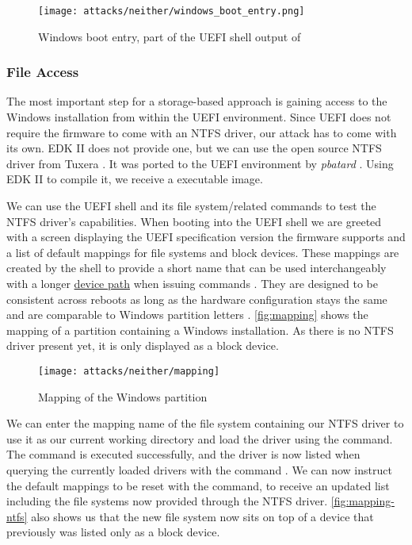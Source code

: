 \begin{figure}[htb]
    \centering
    \texttt{[image: attacks/neither/windows\_boot\_entry.png]}
    \caption{Windows boot entry, part of the \ac{UEFI} shell output of }
    \label{fig:windows-boot-entry}
\end{figure}

\subsubsection{File Access}

The most important step for a storage-based approach is gaining access to the Windows installation from within the \ac{UEFI} environment.
Since \ac{UEFI} does not require the firmware to come with an \ac{NTFS} driver, our attack has to come with its own.
\ac{EDK} II does not provide one, but we can use the open source \ac{NTFS} driver  from Tuxera \cite{ntfs-3g}.
It was ported to the \ac{UEFI} environment by \emph{pbatard} \cite{ntfs-3g-uefi}.
Using \ac{EDK} II to compile it, we receive a  executable image.

We can use the \ac{UEFI} shell and its file system\-/related commands to test the \ac{NTFS} driver's capabilities.
When booting into the \ac{UEFI} shell we are greeted with a screen displaying the \ac{UEFI} specification version the firmware supports and a list of default mappings for file systems and block devices.
These mappings are created by the shell to provide a short name that can be used interchangeably with a longer \hyperref[lst:device-path-protocol]{device path} when issuing commands \cite[Section 3.7.2]{uefi-shell-spec}.
They are designed to be consistent across reboots as long as the hardware configuration stays the same and are comparable to Windows partition letters \cite[Appendix A]{uefi-shell-spec}.
\autoref{fig:mapping} shows the mapping of a partition containing a Windows installation.
As there is no \ac{NTFS} driver present yet, it is only displayed as a block device.

\begin{figure}[htb]
    \centering
    \texttt{[image: attacks/neither/mapping]}
    \caption{Mapping of the Windows partition}
    \label{fig:mapping}
\end{figure}

We can enter the mapping name of the file system containing our \ac{NTFS} driver to use it as our current working directory and load the driver using the  command.
The command is executed successfully, and the driver is now listed when querying the currently loaded drivers with the command .
We can now instruct the default mappings to be reset with the \mbox{} command, to receive an updated list including the file systems now provided through the \ac{NTFS} driver.
\autoref{fig:mapping-ntfs} also shows us that the new file system now sits on top of a device that previously was listed only as a block device.

